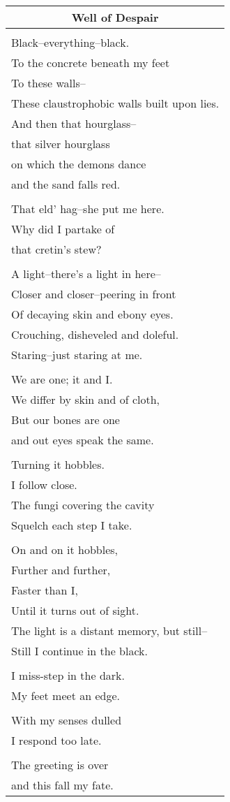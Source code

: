 \documentclass{article}
\begin{document}
\begin{center}
\begin{tabular}{l}
\multicolumn{1}{c}{\textbf{Well of Despair}} \\ \hline
\\
Black--everything--black. \\
To the concrete beneath my feet \\
To these walls-- \\
These claustrophobic walls built upon lies. \\
And then that hourglass-- \\
that silver hourglass \\
on which the demons dance \\
and the sand falls red. \\
\\
That eld' hag--she put me here. \\
Why did I partake of \\
that cretin's stew? \\
\\
A light--there's a light in here-- \\
Closer and closer--peering in front \\
Of decaying skin and ebony eyes. \\
Crouching, disheveled and doleful. \\
Staring--just staring at me. \\
\\
We are one; it and I. \\
We differ by skin and of cloth, \\
But our bones are one \\
and out eyes speak the same. \\
\\
Turning it hobbles. \\
I follow close. \\
The fungi covering the cavity \\
Squelch each step I take. \\
\\
On and on it hobbles, \\
Further and further, \\
Faster than I, \\
Until it turns out of sight. \\
The light is a distant memory, but still-- \\
Still I continue in the black. \\
\\
I miss-step in the dark. \\
My feet meet an edge. \\
\\
With my senses dulled \\
I respond too late. \\
\\
The greeting is over \\
and this fall my fate. \\
\end{tabular}
\end{center}
\end{document}
